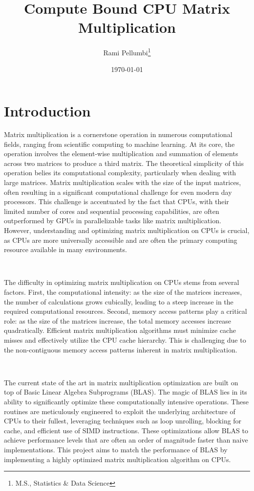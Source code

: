 \documentclass[12pt]{article}
\title{Compute Bound CPU Matrix Multiplication}
\author{Rami Pellumbi\thanks{M.S., Statistics \& Data Science}}
\date{\today}
\begin{document}
\maketitle

\newpage 

\section{Introduction}
Matrix multiplication is a cornerstone operation in numerous computational fields,
ranging from scientific computing to machine learning. At its core, the operation 
involves the element-wise multiplication and summation of elements across two matrices 
to produce a third matrix. The theoretical simplicity of this operation belies its 
computational complexity, particularly when dealing with large matrices. 
Matrix multiplication scales with the size of the input matrices, often resulting 
in a significant computational challenge for even modern day processors. 
This challenge is accentuated by the fact that CPUs, with their limited number 
of cores and sequential processing capabilities, are often outperformed by GPUs in 
parallelizable tasks like matrix multiplication. However, understanding and optimizing 
matrix multiplication on CPUs is crucial, as CPUs are more universally accessible 
and are often the primary computing resource available in many environments.

\ 

\noindent The difficulty in optimizing matrix multiplication on CPUs stems from several factors. 
First, the computational intensity: as the size of the matrices increases, 
the number of calculations grows cubically, leading to a steep increase in the 
required computational resources. Second, memory access patterns play a critical role: as the 
size of the matrices increase, the total memory accesses increase quadratically.
Efficient matrix multiplication algorithms must minimize cache misses and effectively utilize 
the CPU cache hierarchy. This is challenging due to the non-contiguous memory access 
patterns inherent in matrix multiplication. 

\

\noindent The current state of the art in matrix multiplication optimization are built 
on top of Basic Linear Algebra Subprograms (BLAS). The magic of BLAS lies in its ability 
to significantly optimize these computationally intensive operations. 
These routines are meticulously engineered to exploit the underlying architecture of CPUs to their fullest, 
leveraging techniques such as loop unrolling, blocking for cache, and efficient use of SIMD instructions. 
These optimizations allow BLAS to achieve performance levels that are often an order 
of magnitude faster than naive implementations. This project aims to match the performance 
of BLAS by implementing a highly optimized matrix multiplication algorithm on CPUs. 
\end{document}
